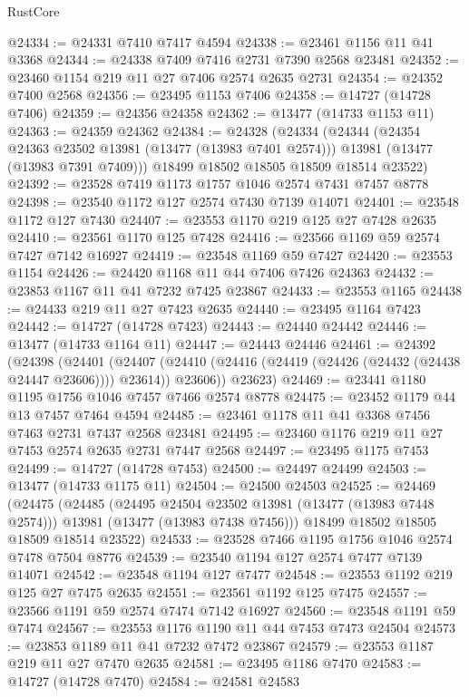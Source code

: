 \begin{lexlean}{RustCore}
\begin{coremodule}
@24334 := @24331 @7410 @7417 @4594
@24338 := @23461 @1156 @11 @41 @3368
@24344 := @24338 @7409 @7416 @2731 @7390 @2568 @23481
@24352 := @23460 @1154 @219 @11 @27 @7406 @2574 @2635 @2731
@24354 := @24352 @7400 @2568
@24356 := @23495 @1153 @7406
@24358 := @14727 (@14728 @7406)
@24359 := @24356 @24358
@24362 := @13477 (@14733 @1153 @11)
@24363 := @24359 @24362
@24384 := @24328
    (@24334
      (@24344
        (@24354 @24363 @23502 @13981 (@13477 (@13983 @7401 @2574)))
        @13981
        (@13477 (@13983 @7391 @7409)))
      @18499
      @18502
      @18505
      @18509
      @18514
      @23522)
@24392 := @23528 @7419 @1173 @1757 @1046 @2574 @7431 @7457 @8778
@24398 := @23540 @1172 @127 @2574 @7430 @7139 @14071
@24401 := @23548 @1172 @127 @7430
@24407 := @23553 @1170 @219 @125 @27 @7428 @2635
@24410 := @23561 @1170 @125 @7428
@24416 := @23566 @1169 @59 @2574 @7427 @7142 @16927
@24419 := @23548 @1169 @59 @7427
@24420 := @23553 @1154
@24426 := @24420 @1168 @11 @44 @7406 @7426 @24363
@24432 := @23853 @1167 @11 @41 @7232 @7425 @23867
@24433 := @23553 @1165
@24438 := @24433 @219 @11 @27 @7423 @2635
@24440 := @23495 @1164 @7423
@24442 := @14727 (@14728 @7423)
@24443 := @24440 @24442
@24446 := @13477 (@14733 @1164 @11)
@24447 := @24443 @24446
@24461 := @24392
    (@24398
      (@24401
        (@24407 (@24410 (@24416 (@24419 (@24426 (@24432 (@24438 @24447 @23606)))) @23614)) @23606))
      @23623)
@24469 := @23441 @1180 @1195 @1756 @1046 @7457 @7466 @2574 @8778
@24475 := @23452 @1179 @44 @13 @7457 @7464 @4594
@24485 := @23461 @1178 @11 @41 @3368 @7456 @7463 @2731 @7437 @2568 @23481
@24495 := @23460 @1176 @219 @11 @27 @7453 @2574 @2635 @2731 @7447 @2568
@24497 := @23495 @1175 @7453
@24499 := @14727 (@14728 @7453)
@24500 := @24497 @24499
@24503 := @13477 (@14733 @1175 @11)
@24504 := @24500 @24503
@24525 := @24469
    (@24475
      (@24485
        (@24495 @24504 @23502 @13981 (@13477 (@13983 @7448 @2574)))
        @13981
        (@13477 (@13983 @7438 @7456)))
      @18499
      @18502
      @18505
      @18509
      @18514
      @23522)
@24533 := @23528 @7466 @1195 @1756 @1046 @2574 @7478 @7504 @8776
@24539 := @23540 @1194 @127 @2574 @7477 @7139 @14071
@24542 := @23548 @1194 @127 @7477
@24548 := @23553 @1192 @219 @125 @27 @7475 @2635
@24551 := @23561 @1192 @125 @7475
@24557 := @23566 @1191 @59 @2574 @7474 @7142 @16927
@24560 := @23548 @1191 @59 @7474
@24567 := @23553 @1176 @1190 @11 @44 @7453 @7473 @24504
@24573 := @23853 @1189 @11 @41 @7232 @7472 @23867
@24579 := @23553 @1187 @219 @11 @27 @7470 @2635
@24581 := @23495 @1186 @7470
@24583 := @14727 (@14728 @7470)
@24584 := @24581 @24583

\end{coremodule}
\end{lexlean}
